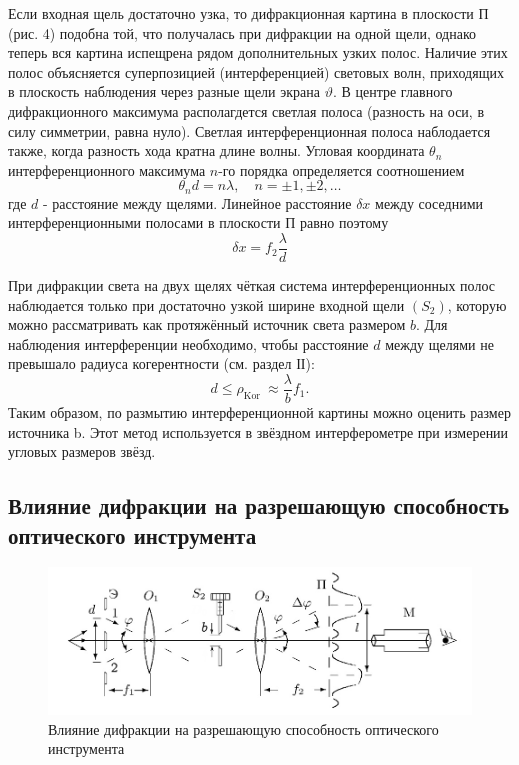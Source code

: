 \documentclass[a4paper, 12pt]{article}
\begin{document}
Если входная щель достаточно узка, то дифракционная картина в плоскости П (рис. 4) подобна той, что получалась при дифракции на одной щели, однако теперь вся картина
испещрена рядом дополнительных узких полос. Наличие этих полос объясняется суперпозицией (интерференцией) световых волн, приходящих в плоскость наблюдения через разные щели экрана $\vartheta$. В центре главного дифракционного максимума располагдется светлая полоса (разность на оси, в силу симметрии, равна нуло). Светлая интерференционная полоса наблодается также, когда разность хода кратна длине волны. Угловая координата $\theta_n$ интерференционного максимума $n$-го порядка определяется соотношением
\begin{equation*}
\theta_n d=n \lambda, \quad n= \pm 1, \pm 2, \ldots
\end{equation*}
где $d$ - расстояние между щелями. Линейное расстояние $\delta x$ между соседними интерференционными полосами в плоскости П равно поэтому
\begin{equation*}
\delta x=f_2 \frac{\lambda}{d}
\end{equation*}

При дифракции света на двух щелях чёткая система интерференционных полос наблюдается только при достаточно узкой ширине входной щели $\left(S_2\right)$, которую можно рассматривать как протяжённый источник света размером $b$. Для наблюдения интерференции необходимо, чтобы расстояние $d$ между щелями не превышало радиуса когерентности (см. раздел ІІ):
\begin{equation*}
d \leqslant \rho_{\text {Kor }} \approx \frac{\lambda}{b} f_1 .
\end{equation*}
Таким образом, по размытию интерференционной картины можно оценить размер источника b. Этот метод используется в звёздном интерферометре при измерении угловых размеров звёзд.

\subsection*{Влияние дифракции на разрешающую способность оптического инструмента}

\begin{figure}[H]
    \centering
    \includegraphics[width=1\textwidth]{razresh.jpg}
    \caption{Влияние дифракции на разрешающую способность оптического инструмента}
    \label{fig:ris4}
\end{figure}
\end{document}
